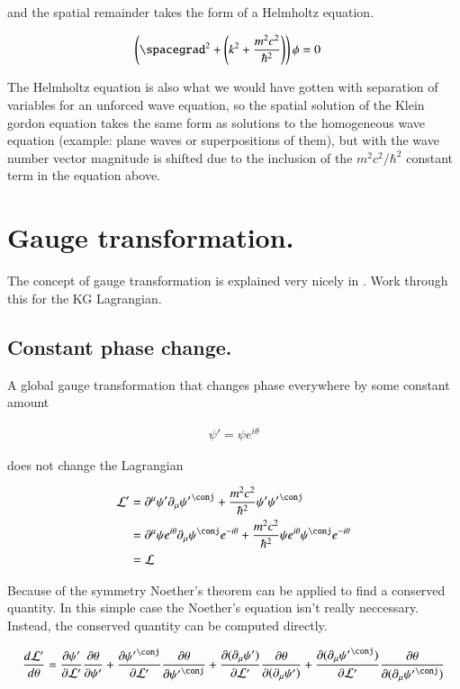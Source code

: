 \documentclass{article}
\begin{document}
and the spatial remainder takes the form of a Helmholtz equation.

\begin{align*}
\left( \spacegrad^2 + \left( k^2 + \frac{m^2 c^2}{\hbar^2} \right) \right) \phi &= 0
\end{align*}

The Helmholtz equation is also what we would have gotten with separation of variables for an unforced wave
equation, so the spatial solution of the Klein gordon equation takes the same form as solutions to the 
homogeneous wave equation (example: plane waves or superpositions of them), but with the wave number vector magnitude is shifted due to the inclusion of
the $m^2 c^2/\hbar^2$ constant term in the equation above.

\section{ Gauge transformation. }

The concept of gauge transformation is explained very nicely in \cite{vtgauge}.  Work through this 
for the KG Lagrangian.

\subsection{ Constant phase change. }

A global gauge transformation that changes phase everywhere by some constant amount

\begin{align*}
\psi' = \psi e^{i\theta}
\end{align*}

does not change the Lagrangian

\begin{align*}
\LL' 
&= \partial^\mu \psi'  \partial_\mu {\psi'}^\conj + \frac{m^2 c^2}{\hbar^2}\psi' {\psi'}^\conj \\
&= \partial^\mu \psi e^{i\theta} \partial_\mu \psi^\conj e^{-i\theta} + \frac{m^2 c^2}{\hbar^2}\psi e^{i\theta}\psi^\conj e^{-i\theta} \\
&= \LL
\end{align*}

Because of the symmetry Noether's theorem can be applied to find a conserved quantity.  In this simple case the Noether's equation isn't really neccessary.
Instead, the conserved quantity can be computed directly.

\begin{align*}
\frac{d\LL'}{d\theta}
&=
\PD{\psi'}{\LL'} \PD{\theta}{\psi'}
+\PD{{\psi'}^\conj}{\LL'} \PD{\theta}{{\psi'}^\conj}
+\PD{(\partial_\mu \psi')}{\LL'} \PD{\theta}{(\partial_\mu \psi')}
+\PD{(\partial_\mu {\psi'}^\conj)}{\LL'} \PD{\theta}{(\partial_\mu {\psi'}^\conj)} \\
\end{align*}
\end{document}
